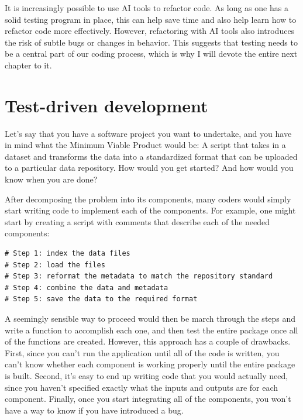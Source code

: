 It is increasingly possible to use AI tools to refactor code.
As long as one has a solid testing program in place, this can help save time and also help learn how to refactor code more effectively.
However, refactoring with AI tools also introduces the risk of subtle bugs or changes in behavior. 
This suggests that testing needs to be a central part of our coding process, which is why I will devote the entire next chapter to it.

\section{Test-driven development}

Let's say that you have a software project you want to undertake, and you have in mind what the Minimum Viable Product would be: A script that takes in a dataset and transforms the data into a standardized format that can be uploaded to a particular data repository.
How would you get started? And how would you know when you are done?

After decomposing the problem into its components, many coders would simply start writing code to implement each of the components.
For example, one might start by creating a script with comments that describe each of the needed components:

\begin{lstlisting}[style=Python]
# Step 1: index the data files
# Step 2: load the files
# Step 3: reformat the metadata to match the repository standard
# Step 4: combine the data and metadata
# Step 5: save the data to the required format
\end{lstlisting}

A seemingly sensible way to proceed would then be march through the steps and write a function to accomplish each one, and then test the entire package once all of the functions are created.
However, this approach has a couple of drawbacks.
First, since you can't run the application until all of the code is written, you can't know whether each component is working properly until the entire package is built.
Second, it's easy to end up writing code that you would actually need, since you haven't specified exactly what the inputs and outputs are for each component.
Finally, once you start integrating all of the components, you won't have a way to know if you have introduced a bug.

